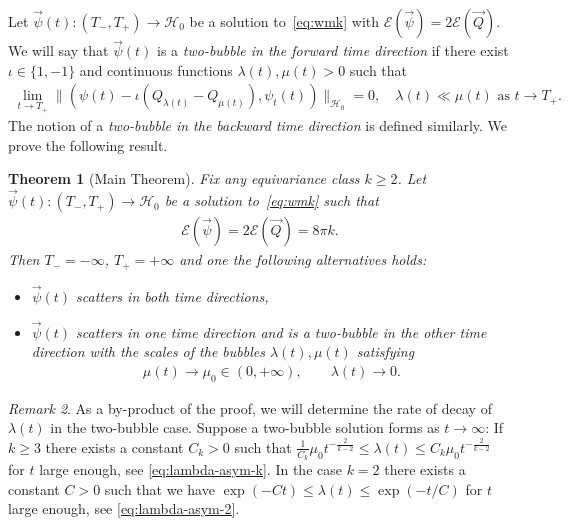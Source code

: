 \documentclass[10pt,reqno]{amsart}
\newcommand{\E}{\mathcal{E}}
\newcommand{\HH}{\mathcal{H}}
\newcommand{\la}{\lambda}
\newcommand{\EQ}[1]{\begin{equation}\begin{split} #1 \end{split}\end{equation}}
\numberwithin{equation}{section}
\newtheorem{thm}{Theorem}[section]
\theoremstyle{remark}
\newtheorem{rem}[thm]{Remark}
\newcommand{\0}{\emptyset}
\begin{document}
 Let $\vec \psi(t) : (T_-, T_+) \to \HH_0$ be a solution to~\eqref{eq:wmk} with $\E(\vec \psi) = 2 \E(\vec Q)$. We will say that $\vec\psi(t)$ is a \emph{two-bubble in
 the forward time direction} if there exist $\iota \in \{1, -1\}$
 and continuous functions $\lambda(t), \mu(t) > 0$ such that
 \EQ{
\lim_{t \to T_+} \| (\psi(t) - \iota(Q_{\la(t)} - Q_{\mu(t)}), \psi_t(t))\|_{\HH_0} = 0, \quad \lambda(t) \ll \mu(t)\text{ as }t \to T_+.
}
The notion of a \emph{two-bubble in the backward time direction} is defined similarly. We prove the following result. 
 \begin{thm}[Main Theorem] \label{t:main} 
Fix any equivariance class $k \ge 2$.  Let $\vec\psi(t) :(T_-, T_+) \to \HH_0$ be a solution to~\eqref{eq:wmk} such that
\EQ{
\E(\vec \psi) = 2 \E(\vec Q) = 8\pi k.
}
Then $T_- = -\infty$, $T_+ = +\infty$ and one the following alternatives holds:
 \begin{itemize}[leftmargin=0.5cm]
\item $\vec \psi(t)$ scatters in both time directions,
\item $\vec\psi(t)$ scatters in one time direction and is a two-bubble in the other time direction with the scales of the bubbles $\lambda(t), \mu(t)$ satisfying
\EQ{
\mu(t) \to \mu_0 \in (0, +\infty),\qquad \lambda(t) \to 0.
}
\end{itemize} 
 \end{thm}  
 \begin{rem}
 As a by-product of the proof, we will determine the rate of decay of $\lambda(t)$ in the two-bubble case. Suppose a two-bubble solution forms as $t \to \infty$: If $k \ge 3$ there exists a constant $C_k > 0$ such that  $\frac{1}{C_k}\mu_0 t^{-\frac{2}{k-2}} \leq \la(t) \leq C_k\mu_0 t^{-\frac{2}{k-2}}$
 for $t$ large enough, see \eqref{eq:lambda-asym-k}.
 In the case $k=2$ there exists a constant $C > 0$ such that we have $\exp( -C  t) \le \la(t) \le \exp(- t/C)$
 for $t$ large enough, see \eqref{eq:lambda-asym-2}. 
 \end{rem}
\end{document}
